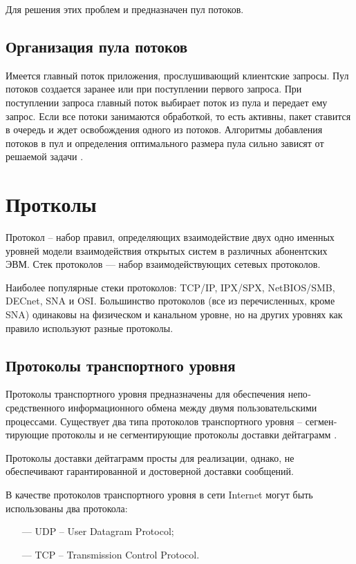Для решения этих проблем и предназначен пул потоков.

\subsection{Организация пула потоков}

Имеется главный поток приложения, прослушивающий клиентские запросы. Пул потоков создается заранее или при поступлении первого запроса. При поступлении запроса главный поток выбирает поток из пула и передает ему запрос. Если все потоки занимаются обработкой, то есть активны, пакет ставится в очередь и ждет освобождения одного из потоков. Алгоритмы добавления потоков в пул и определения оптимального размера пула сильно зависят от решаемой задачи \cite{multithread}.

\section{Протколы}

Протокол -- набор правил, определяющих взаимодействие двух одно­ именных уровней модели взаимодействия открытых систем в различных абонентских ЭВМ. Стек протоколов — набор взаимодействующих сетевых протоколов.

Наиболее популярные стеки протоколов: TCP/IP, IPX/SPX, NetBIOS/SMB, DECnet, SNA и OSI. Большинство протоколов (все из перечисленных, кроме SNA) одинаковы на физическом и канальном уровне, но на других уровнях как правило используют разные протоколы.

\subsection{Протоколы транспортного уровня}

Протоколы транспортного уровня предназначены для обеспечения непо­ средственного информационного обмена между двумя пользовательскими процессами. Существует два типа протоколов транспортного уровня – сегмен­тирующие протоколы и не сегментирующие протоколы доставки дейтаграмм \cite{transport-level-protocol}.

Протоколы доставки дейтаграмм просты для реализации, однако, не обеспечивают гарантированной и достоверной доставки сообщений.

В качестве протоколов транспортного уровня в сети Internet могут быть использованы два протокола:

\begin{itemize}
	\item[---] UDP	-- User Datagram Protocol;
	\item[---] TCP -- Transmission Control Protocol.
\end{itemize}

